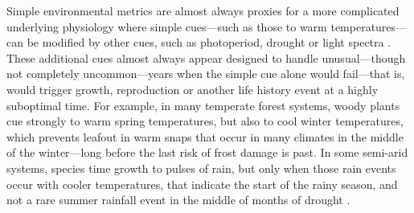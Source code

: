\documentclass[11pt,letterpaper]{article}
\begin{document}
Simple environmental metrics are almost always proxies for a more complicated underlying physiology where simple cues---such as those to warm temperatures---can be modified by other cues, such as photoperiod, drought or light spectra \citep{Bagnall1993,Stinchcombe:2004ec}. These additional cues almost always appear designed to handle unusual---though not completely uncommon---years when the simple cue alone would fail---that is, would trigger growth, reproduction or another life history event at a highly suboptimal time. For example, in many temperate forest systems, woody plants cue strongly to warm spring temperatures, but also to cool winter temperatures, which prevents leafout in warm snaps that occur in many climates in the middle of the winter---long before the last risk of frost damage is past. In some semi-arid systems, species time growth to pulses of rain, but only when those rain events occur with cooler temperatures, that indicate the start of the rainy season, and not a rare summer rainfall event in the middle of months of drought \citep{Wainwright:2012tw,wainwright2013}.  %
\end{document}
